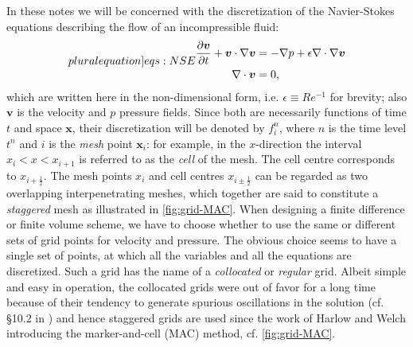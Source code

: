 \documentclass{article}
\numberwithin{equation}{section}
\begin{document}
In these notes we will be concerned with the discretization of the Navier-Stokes equations describing the flow of an incompressible fluid:
\begin{subequations}
\label[pluralequation]{eqs:NSE}
\begin{align}
\label{eqn:momentum-intro}
\frac{\partial \boldsymbol{v}}{\partial t} + \boldsymbol{v} \cdot \nabla \boldsymbol{v} &= -\nabla p + \epsilon \nabla \cdot \nabla \boldsymbol{v} \\
\label{eqn:continuity}
\nabla \cdot \boldsymbol{v} &= 0,
\end{align}
\end{subequations}
which are written here in the non-dimensional form, i.e. $\epsilon \equiv Re^{-1}$ for brevity; also $\boldsymbol{v}$ is the velocity and $p$ pressure fields. Since both are necessarily functions of time $t$ and space $\boldsymbol{x}$, their discretization will be denoted by $f^{n}_{i}$, where $n$ is the time level $t^{n}$ and $i$ is the \textit{mesh} point $\boldsymbol{x}_{i}$: for example, in the $x$-direction the interval $x_{i} < x < x_{i+1}$ is referred to as the \textit{cell} of the mesh. The cell centre corresponds to $x_{i+\frac{1}{2}}$. The mesh points $x_{i}$ and cell centres $x_{i \pm \frac{1}{2}}$ can be regarded as two overlapping interpenetrating meshes, which together are said to constitute a \textit{staggered} mesh as illustrated in \cref{fig:grid-MAC}. When designing a finite difference or finite volume scheme, we have to choose whether to use the same or different sets of grid points for velocity and pressure. The obvious choice seems to have a single set of points, at which all the variables and all the equations are discretized. Such a grid
has the name of a \textit{collocated} or \textit{regular} grid. Albeit simple and easy in operation, the collocated grids were out of favor for a long time because of their tendency to generate spurious oscillations in the solution (cf. \S 10.2 in \cite{Zikanov:2010}) and hence staggered grids are used since the work of Harlow and Welch \cite{Harlow:1965} introducing the marker-and-cell (MAC) method, cf. \cref{fig:grid-MAC}.
\end{document}
